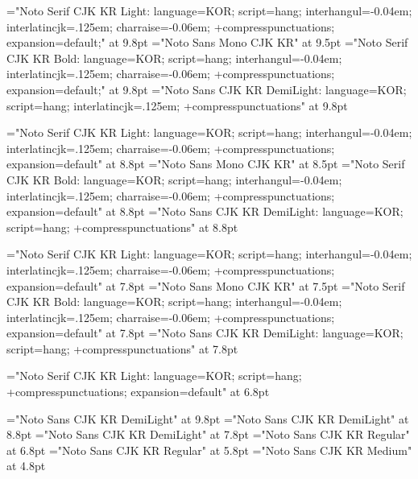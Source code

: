 


%
%
\sethangulfont\tenmj="Noto Serif CJK KR Light:%
  language=KOR;%
  script=hang;%
  interhangul=-0.04em;%
  interlatincjk=.125em;%
  charraise=-0.06em;%
  +compresspunctuations;%
  expansion=default;" at 9.8pt
\sethangulfont\tentz="Noto Sans Mono CJK KR" at 9.5pt
\sethangulfont\tenbd="Noto Serif CJK KR Bold:%
  language=KOR;%
  script=hang;%
  interhangul=-0.04em;%
  interlatincjk=.125em;%
  charraise=-0.06em;%
  +compresspunctuations;%
  expansion=default;" at 9.8pt
\sethangulfont\tensn="Noto Sans CJK KR DemiLight:%
  language=KOR;%
  script=hang;%
  interlatincjk=.125em;%
  +compresspunctuations" at 9.8pt

\sethangulfont\ninemj="Noto Serif CJK KR Light:%
  language=KOR;%
  script=hang;%
  interhangul=-0.04em;%
  interlatincjk=.125em;%
  charraise=-0.06em;%
  +compresspunctuations;%
  expansion=default" at 8.8pt
\sethangulfont\ninetz="Noto Sans Mono CJK KR" at 8.5pt
\sethangulfont\ninebd="Noto Serif CJK KR Bold:%
  language=KOR;%
  script=hang;%
  interhangul=-0.04em;%
  interlatincjk=.125em;%
  charraise=-0.06em;%
  +compresspunctuations;%
  expansion=default" at 8.8pt
\sethangulfont\ninesn="Noto Sans CJK KR DemiLight:%
  language=KOR;%
  script=hang;%
  +compresspunctuations" at 8.8pt

\sethangulfont\eightmj="Noto Serif CJK KR Light:%
  language=KOR;%
  script=hang;%
  interhangul=-0.04em;%
  interlatincjk=.125em;%
  charraise=-0.06em;%
  +compresspunctuations;%
  expansion=default" at 7.8pt
\sethangulfont\eighttz="Noto Sans Mono CJK KR" at 7.5pt
\sethangulfont\eightbd="Noto Serif CJK KR Bold:%
  language=KOR;%
  script=hang;%
  interhangul=-0.04em;%
  interlatincjk=.125em;%
  charraise=-0.06em;%
  +compresspunctuations;%
  expansion=default" at 7.8pt
\sethangulfont\eightsn="Noto Sans CJK KR DemiLight:%
  language=KOR;%
  script=hang;%
  +compresspunctuations" at 7.8pt

\sethangulfont\sevenmj="Noto Serif CJK KR Light:%
  language=KOR;%
  script=hang;%
  +compresspunctuations;%
  expansion=default" at 6.8pt

\font\texthangul="Noto Sans CJK KR DemiLight" at 9.8pt
\font\texthangulnine="Noto Sans CJK KR DemiLight" at 8.8pt
\font\texthanguleight="Noto Sans CJK KR DemiLight" at 7.8pt
\font\scripthangul="Noto Sans CJK KR Regular" at 6.8pt
\font\scripthangulsix="Noto Sans CJK KR Regular" at 5.8pt
\font\scriptscripthangul="Noto Sans CJK KR Medium" at 4.8pt

